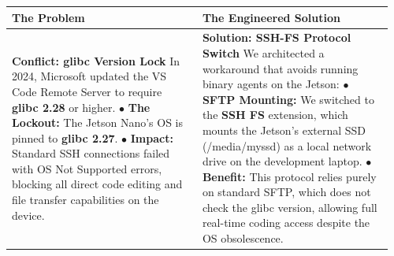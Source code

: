 {
	\renewcommand{\arraystretch}{1.5}
	\small
	
	\noindent
	\begin{tabular}{|p{0.48\linewidth}|p{0.48\linewidth}|}
		\hline
		\cellcolor{red!40!black}\textbf{\color{white} The Problem} & 
		\cellcolor{blue!40!black}\textbf{\color{white} The Engineered Solution} \\ 
		\hline
		\cellcolor{gray!10}
		\textbf{Conflict: glibc Version Lock} \newline
		In 2024, Microsoft updated the VS Code Remote Server to require \textbf{glibc 2.28} or higher.
		\newline \newline
		$\bullet$ \textbf{The Lockout:} The Jetson Nano's OS is pinned to \textbf{glibc 2.27}. \newline
		$\bullet$ \textbf{Impact:} Standard SSH connections failed with OS Not Supported errors, blocking all direct code editing and file transfer capabilities on the device.
		& 
		\cellcolor{gray!10}
		\textbf{Solution: SSH-FS Protocol Switch} \newline
		We architected a workaround that avoids running binary agents on the Jetson:
		\newline \newline
		$\bullet$ \textbf{SFTP Mounting:} We switched to the \textbf{SSH FS} extension, which mounts the Jetson's external SSD (/media/myssd) as a local network drive on the development laptop. \newline
		$\bullet$ \textbf{Benefit:} This protocol relies purely on standard SFTP, which does not check the glibc version, allowing full real-time coding access despite the OS obsolescence. \\
		\hline
	\end{tabular}
}


